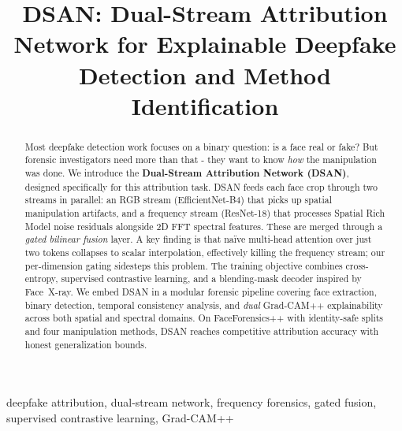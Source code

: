 \documentclass[conference]{IEEEtran}
\begin{document}
\title{DSAN: Dual-Stream Attribution Network for Explainable Deepfake Detection and Method Identification}

\author{
}

\maketitle

\begin{abstract}
Most deepfake detection work focuses on a binary question: is a face real or fake? But forensic investigators need more than that - they want to know \textit{how} the manipulation was done. We introduce the \textbf{Dual-Stream Attribution Network (DSAN)}, designed specifically for this attribution task. DSAN feeds each face crop through two streams in parallel: an RGB stream (EfficientNet-B4) that picks up spatial manipulation artifacts, and a frequency stream (ResNet-18) that processes Spatial Rich Model noise residuals alongside 2D FFT spectral features. These are merged through a \textit{gated bilinear fusion} layer. A key finding is that na\"ive multi-head attention over just two tokens collapses to scalar interpolation, effectively killing the frequency stream; our per-dimension gating sidesteps this problem. The training objective combines cross-entropy, supervised contrastive learning, and a blending-mask decoder inspired by Face~X-ray. We embed DSAN in a modular forensic pipeline covering face extraction, binary detection, temporal consistency analysis, and \textit{dual} Grad-CAM++ explainability across both spatial and spectral domains. On FaceForensics++ with identity-safe splits and four manipulation methods, DSAN reaches competitive attribution accuracy with honest generalization bounds.
\end{abstract}

\begin{IEEEkeywords}
deepfake attribution, dual-stream network, frequency forensics, gated fusion, supervised contrastive learning, Grad-CAM++
\end{IEEEkeywords}










\end{document}
